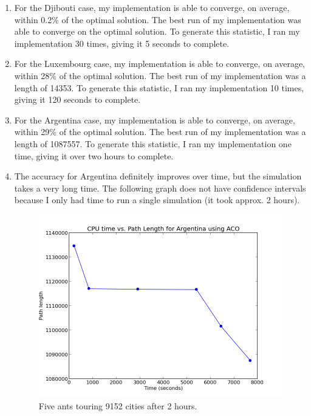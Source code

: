 \documentclass{article}
\begin{document}
\begin{enumerate}

\item{} %

For the Djibouti case, my implementation is able to converge, on average, within
0.2\% of the optimal solution. The best run of my implementation was able to
converge on the optimal solution. To generate this statistic, I ran my
implementation 30 times, giving it 5 seconds to complete.

\item{} %

For the Luxembourg case, my implementation is able to converge, on average,
within 28\% of the optimal solution. The best run of my implementation was
a length of 14353. To generate this statistic, I ran my implementation 10 times,
giving it 120 seconds to complete.

\item{} %
For the Argentina case, my implementation is able to converge, on average,
within 29\% of the optimal solution. The best run of my implementation was
a length of 1087557. To generate this statistic, I ran my implementation one
time, giving it over two hours to complete.

\item{} %
The accuracy for Argentina definitely improves over time, but the simulation
takes a very long time. The following graph does not have confidence intervals
because I only had time to run a single simulation (it took approx. 2 hours).

\begin{figure}[H]
\centering
\includegraphics[width=\textwidth]{figs/figure_1.png}
\caption{Five ants touring 9152 cities after 2 hours. }
\end{figure}

\end{enumerate}
\end{document}
